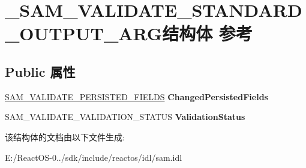 \hypertarget{struct___s_a_m___v_a_l_i_d_a_t_e___s_t_a_n_d_a_r_d___o_u_t_p_u_t___a_r_g}{}\section{\+\_\+\+S\+A\+M\+\_\+\+V\+A\+L\+I\+D\+A\+T\+E\+\_\+\+S\+T\+A\+N\+D\+A\+R\+D\+\_\+\+O\+U\+T\+P\+U\+T\+\_\+\+A\+R\+G结构体 参考}
\label{struct___s_a_m___v_a_l_i_d_a_t_e___s_t_a_n_d_a_r_d___o_u_t_p_u_t___a_r_g}
\subsection*{Public 属性}
\begin{DoxyCompactItemize}
\item 
\mbox{\label{struct___s_a_m___v_a_l_i_d_a_t_e___s_t_a_n_d_a_r_d___o_u_t_p_u_t___a_r_g_ad4ec2e365ff77b6b7ba1d1fa6e3ddc7e}} 
\hyperlink{struct___s_a_m___v_a_l_i_d_a_t_e___p_e_r_s_i_s_t_e_d___f_i_e_l_d_s}{S\+A\+M\+\_\+\+V\+A\+L\+I\+D\+A\+T\+E\+\_\+\+P\+E\+R\+S\+I\+S\+T\+E\+D\+\_\+\+F\+I\+E\+L\+DS} {\bfseries Changed\+Persisted\+Fields}
\item 
\mbox{\label{struct___s_a_m___v_a_l_i_d_a_t_e___s_t_a_n_d_a_r_d___o_u_t_p_u_t___a_r_g_af3386ddc5326519c6cb221d4c8875ab2}} 
S\+A\+M\+\_\+\+V\+A\+L\+I\+D\+A\+T\+E\+\_\+\+V\+A\+L\+I\+D\+A\+T\+I\+O\+N\+\_\+\+S\+T\+A\+T\+US {\bfseries Validation\+Status}
\end{DoxyCompactItemize}


该结构体的文档由以下文件生成\+:\begin{DoxyCompactItemize}
\item 
E\+:/\+React\+O\+S-\/0../sdk/include/reactos/idl/sam.\+idl\end{DoxyCompactItemize}
